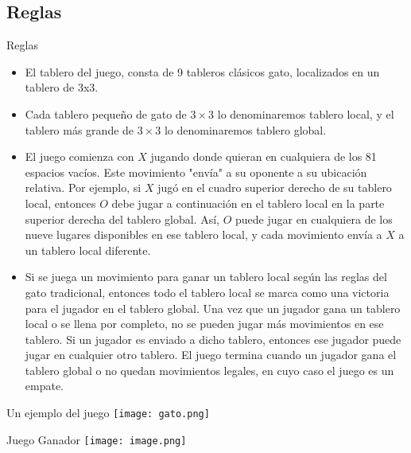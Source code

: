 \documentclass{beamer}
\begin{document}
\subsection{Reglas}
\begin{frame}{Reglas}
\begin{itemize}
    \item El tablero del juego, consta de 9 tableros clásicos gato, localizados en un tablero de 3x3.
    \item Cada tablero pequeño de gato de $3 \times 3$ lo denominaremos tablero local, y el tablero más grande de $3 \times 3$ lo denominaremos tablero global.
    \item El juego comienza con $X$ jugando donde quieran en cualquiera de los 81 espacios vacíos. Este movimiento "envía" a su oponente a su ubicación relativa. Por ejemplo, si $X$ jugó en el cuadro superior derecho de su tablero local, entonces $O$ debe jugar a continuación en el tablero local en la parte superior derecha del tablero global. Así, $O$ puede jugar en cualquiera de los nueve lugares disponibles en ese tablero local, y cada movimiento envía a $X$ a un tablero local diferente.
    
\end{itemize}
\end{frame}
\begin{frame}
\begin{itemize}
\item Si se juega un movimiento para ganar un tablero local según las reglas del gato tradicional, entonces todo el tablero local se marca como una victoria para el jugador en el tablero global. Una vez que un jugador gana un tablero local o se llena por completo, no se pueden jugar más movimientos en ese tablero. Si un jugador es enviado a dicho tablero, entonces ese jugador puede jugar en cualquier otro tablero. El juego termina cuando un jugador gana el tablero global o no quedan movimientos legales, en cuyo caso el juego es un empate.
\end{itemize}
\end{frame}
\begin{frame}{Un ejemplo del juego}
\texttt{[image: gato.png]}
\end{frame}
\begin{frame}{Juego Ganador}
\centering
\texttt{[image: image.png]}
\end{frame}
\end{document}
